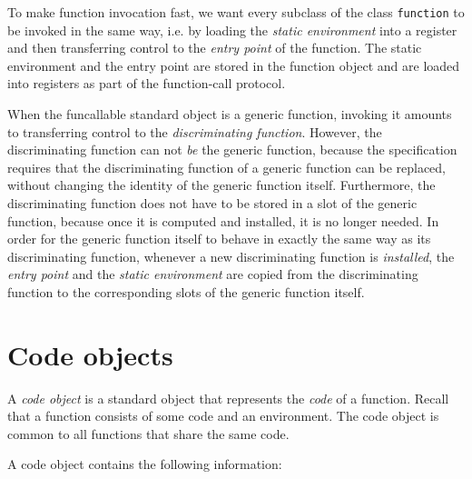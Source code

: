 To make function invocation fast, we want every subclass of the class
\texttt{function} to be invoked in the same way, i.e. by loading the
\emph{static environment} into a register and then transferring
control to the \emph{entry point} of the function. The static
environment and the entry point are stored in the function object
and are loaded into registers as part of the function-call protocol.

When the funcallable standard object is a generic function, invoking
it amounts to transferring control to the \emph{discriminating
  function}.  However, the discriminating function can not \emph{be}
the generic function, because the \clos{} specification requires that
the discriminating function of a generic function can be replaced,
without changing the identity of the generic function itself.
Furthermore, the discriminating function does not have to be stored in
a slot of the generic function, because once it is computed and
installed, it is no longer needed.  In order for the generic function
itself to behave in exactly the same way as its discriminating
function, whenever a new discriminating function is \emph{installed},
the \emph{entry point} and the \emph{static environment} are copied
from the discriminating function to the corresponding slots of the
generic function itself.

\section{Code objects}
\label{data-representation-code-objects}

A \emph{code object} is a standard object that represents the
\emph{code} of a function.  Recall that a function consists of some
code and an environment.  The code object is common to all functions
that share the same code.

A code object contains the following information:

